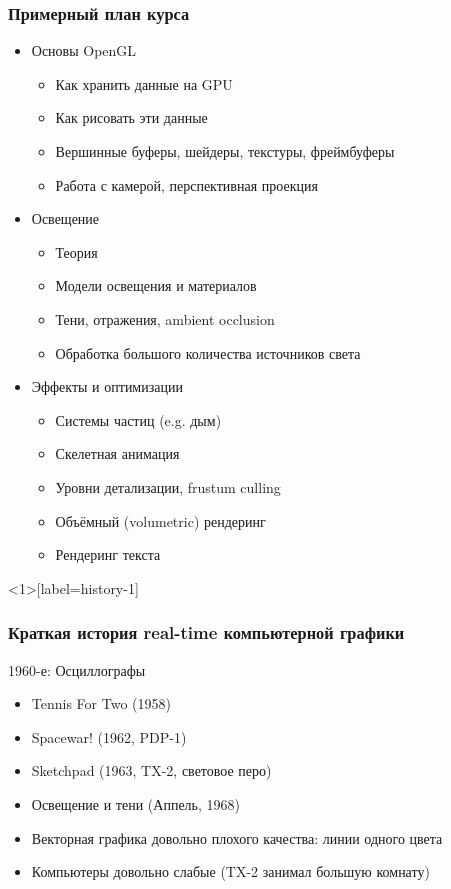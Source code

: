 \documentclass{beamer}
\begin{document}
\begin{frame}
\frametitle{Примерный план курса}
\pause
\begin{itemize}
\item Основы OpenGL
\begin{itemize}
\item Как хранить данные на GPU
\item Как рисовать эти данные
\item Вершинные буферы, шейдеры, текстуры, фреймбуферы
\item Работа с камерой, перспективная проекция
\end{itemize}
\pause
\item Освещение
\begin{itemize}
\item Теория
\item Модели освещения и материалов
\item Тени, отражения, ambient occlusion
\item Обработка большого количества источников света
\end{itemize}
\pause
\item Эффекты и оптимизации
\begin{itemize}
\item Системы частиц (e.g. дым)
\item Скелетная анимация
\item Уровни детализации, frustum culling
\item Объёмный (volumetric) рендеринг
\item Рендеринг текста
\end{itemize}
\end{itemize}
\end{frame}

\begin{frame}<1>[label=history-1]
\frametitle{Краткая история real-time компьютерной графики}
\centerline{1960-е: Осциллографы}
\pause
\begin{itemize}
\item Tennis For Two (1958)
\pause
\item Spacewar! (1962, PDP-1)
\pause
\item Sketchpad (1963, TX-2, световое перо)
\pause
\item Освещение и тени (Аппель, 1968)
\pause
\item Векторная графика довольно плохого качества: линии одного цвета
\item Компьютеры довольно слабые (TX-2 занимал большую комнату)
\end{itemize}
\end{frame}
\end{document}
